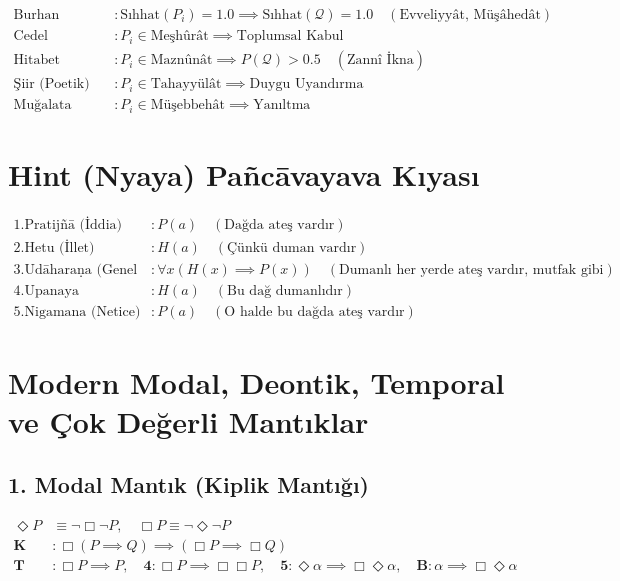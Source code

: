 \documentclass[11pt, a4paper]{article}
\begin{document}
\begin{align}
\text{Burhan (Kesin)} &: \text{Sıhhat}(P_i) = 1.0 \implies \text{Sıhhat}(\mathcal{Q}) = 1.0 \quad (\text{Evveliyyât, Müşâhedât}) \\
\text{Cedel (Diyalektik)} &: P_i \in \text{Meşhûrât} \implies \text{Toplumsal Kabul} \\
\text{Hitabet (Retorik)} &: P_i \in \text{Maznûnât} \implies P(\mathcal{Q}) > 0.5 \quad (\text{Zannî İkna}) \\
\text{Şiir (Poetik)} &: P_i \in \text{Tahayyülât} \implies \text{Duygu Uyandırma} \\
\text{Muğalata (Safsata)} &: P_i \in \text{Müşebbehât} \implies \text{Yanıltma}
\end{align}

\section{Hint (Nyaya) Pañcāvayava Kıyası}

\begin{align}
1. \text{Pratijñā (İddia)} &: P(a) \quad (\text{Dağda ateş vardır}) \\
2. \text{Hetu (İllet)} &: H(a) \quad (\text{Çünkü duman vardır}) \\
3. \text{Udāharaṇa (Genel Örnek)} &: \forall x (H(x) \implies P(x)) \quad (\text{Dumanlı her yerde ateş vardır, mutfak gibi}) \\
4. \text{Upanaya (Uygulama)} &: H(a) \quad (\text{Bu dağ dumanlıdır}) \\
5. \text{Nigamana (Netice)} &: P(a) \quad (\text{O halde bu dağda ateş vardır})
\end{align}

\section{Modern Modal, Deontik, Temporal ve Çok Değerli Mantıklar}

\subsection{1. Modal Mantık (Kiplik Mantığı)}

\begin{align}
\Diamond P &\equiv \neg \Box \neg P, \quad \Box P \equiv \neg \Diamond \neg P \\
\mathbf{K} &: \Box(P \implies Q) \implies (\Box P \implies \Box Q) \\
\mathbf{T} &: \Box P \implies P, \quad \mathbf{4} : \Box P \implies \Box \Box P, \quad \mathbf{5} : \Diamond \alpha \implies \Box \Diamond \alpha, \quad \mathbf{B} : \alpha \implies \Box \Diamond \alpha
\end{align}
\end{document}

